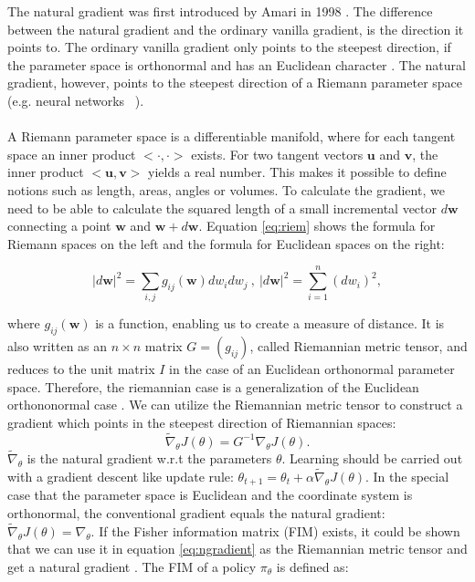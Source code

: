 The natural gradient was first introduced by Amari in 1998 \cite{amari1998natural}. The difference between the natural gradient and the ordinary vanilla gradient, is the direction it points to. The ordinary vanilla gradient only points to the steepest direction, if the parameter space is orthonormal and has an Euclidean character \citep{amari1987differential}. The natural gradient, however, points to the steepest direction of a Riemann parameter space (e.g. neural networks  \citep{amari1998natural}).
\\\\
A Riemann parameter space is a differentiable manifold, where for each tangent space an inner product $<\cdot , \cdot >$ exists. For two tangent vectors $\mathbf{u}$ and $\mathbf{v}$, the inner product $<\mathbf{u}, \mathbf{v}>$ yields a real number. This makes it possible to define notions such as length, areas, angles or volumes. To calculate the gradient, we need to be able to calculate the squared length of a small incremental vector $d\textbf{w}$ connecting a point $\textbf{w}$ and $\textbf{w} + d\textbf{w}$. Equation \ref{eq:riem} shows the formula for Riemann spaces on the left and the formula for Euclidean spaces on the right:

\begin{equation}
	\label{eq:riem}
	|d\textbf{w}|^2 = \sum_{i,j}g_{ij}(\textbf{w}) dw_i dw_j ~,~ |d\textbf{w}|^2 = \sum_{i=1}^{n}(dw_i)^2,
\end{equation}

where $g_{ij}(\textbf{w})$ is a function, enabling us to create a measure of distance. It is also written as an $n \times n$ matrix $G = (g_{ij})$, called Riemannian metric tensor, and reduces to the unit matrix $I$ in the case of an Euclidean orthonormal parameter space. Therefore, the riemannian case is a generalization of the Euclidean orthononormal case \citep{haykin2009neural, amari1998natural}. We can utilize the Riemannian metric tensor to construct a gradient which points in the steepest direction of Riemannian spaces:
\begin{equation}
	\label{eq:ngradient}
	\widetilde{\nabla}_{\theta} J(\theta) = G^{-1} \nabla_\theta J(\theta).
\end{equation}
$\widetilde{\nabla}_{\theta}$ is the natural gradient w.r.t the parameters $\theta$.  Learning should be carried out with a gradient descent like update rule: $\theta_{t+1} = \theta_{t} + \alpha \widetilde{\nabla}_{\theta} J(\theta)$. In the special case that the parameter space is Euclidean and the coordinate system is orthonormal, the conventional gradient equals the natural gradient: $\widetilde{\nabla}_{\theta} J(\theta) = \nabla_{\theta}$.
If the Fisher information matrix (FIM) exists, it could be shown that we can use it in equation \ref{eq:ngradient} as the Riemannian metric tensor and get a natural gradient \citep{peters2008natural, amari1998efficiently}. The FIM of a policy $\pi_{\theta}$ is defined as:

